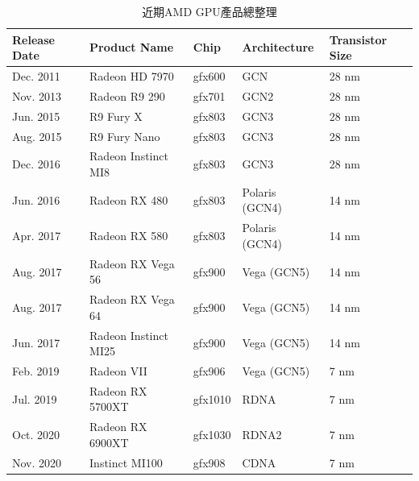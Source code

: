 \begin{table}[htbp]
    \centering
    \caption{近期AMD GPU產品總整理}
    \label{tab:amd-gpu-summary}
    \begin{tabular}{@{}lllll@{}}
        \toprule
        \textbf{Release Date} & \textbf{Product Name}      & \textbf{Chip} & \textbf{Architecture} & \textbf{Transistor Size} \\ \midrule
        Dec. 2011            & Radeon HD 7970            & gfx600        & GCN                   & 28 nm                    \\
        Nov. 2013            & Radeon R9 290             & gfx701        & GCN2                  & 28 nm                    \\
        Jun. 2015            & R9 Fury X                 & gfx803        & GCN3                  & 28 nm                    \\
        Aug. 2015            & R9 Fury Nano              & gfx803        & GCN3                  & 28 nm                    \\
        Dec. 2016            & Radeon Instinct MI8       & gfx803        & GCN3                  & 28 nm                    \\
        Jun. 2016            & Radeon RX 480             & gfx803        & Polaris (GCN4)        & 14 nm                    \\
        Apr. 2017            & Radeon RX 580             & gfx803        & Polaris (GCN4)        & 14 nm                    \\
        Aug. 2017            & Radeon RX Vega 56         & gfx900        & Vega (GCN5)           & 14 nm                    \\
        Aug. 2017            & Radeon RX Vega 64         & gfx900        & Vega (GCN5)           & 14 nm                    \\
        Jun. 2017            & Radeon Instinct MI25      & gfx900        & Vega (GCN5)           & 14 nm                    \\
        Feb. 2019            & Radeon VII                & gfx906        & Vega (GCN5)           & 7 nm                     \\
        Jul. 2019            & Radeon RX 5700XT          & gfx1010       & RDNA                  & 7 nm                     \\
        Oct. 2020            & Radeon RX 6900XT          & gfx1030       & RDNA2                 & 7 nm                     \\
        Nov. 2020            & Instinct MI100            & gfx908        & CDNA                  & 7 nm                     \\

\end{tabular}
\end{table}
